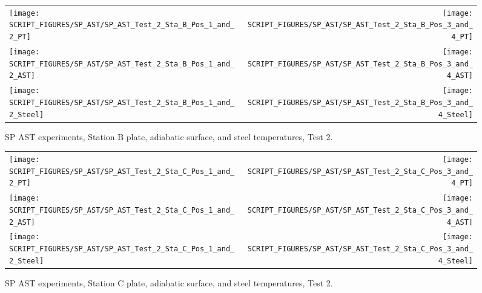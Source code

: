 \begin{figure}[p]
\begin{tabular*}{\textwidth}{l@{\extracolsep{\fill}}r}
\texttt{[image: SCRIPT\_FIGURES/SP\_AST/SP\_AST\_Test\_2\_Sta\_B\_Pos\_1\_and\_2\_PT]} &
\texttt{[image: SCRIPT\_FIGURES/SP\_AST/SP\_AST\_Test\_2\_Sta\_B\_Pos\_3\_and\_4\_PT]} \\
\texttt{[image: SCRIPT\_FIGURES/SP\_AST/SP\_AST\_Test\_2\_Sta\_B\_Pos\_1\_and\_2\_AST]} &
\texttt{[image: SCRIPT\_FIGURES/SP\_AST/SP\_AST\_Test\_2\_Sta\_B\_Pos\_3\_and\_4\_AST]} \\
\texttt{[image: SCRIPT\_FIGURES/SP\_AST/SP\_AST\_Test\_2\_Sta\_B\_Pos\_1\_and\_2\_Steel]} &
\texttt{[image: SCRIPT\_FIGURES/SP\_AST/SP\_AST\_Test\_2\_Sta\_B\_Pos\_3\_and\_4\_Steel]}
\end{tabular*}
\caption[SP AST experiments, Station B plate, adiabatic surface, and steel temperatures, Test 2]{SP AST experiments, Station B plate, adiabatic surface, and steel temperatures, Test 2.}
\label{SP_Test_2_Station_B}
\end{figure}

\begin{figure}[p]
\begin{tabular*}{\textwidth}{l@{\extracolsep{\fill}}r}
\texttt{[image: SCRIPT\_FIGURES/SP\_AST/SP\_AST\_Test\_2\_Sta\_C\_Pos\_1\_and\_2\_PT]} &
\texttt{[image: SCRIPT\_FIGURES/SP\_AST/SP\_AST\_Test\_2\_Sta\_C\_Pos\_3\_and\_4\_PT]} \\
\texttt{[image: SCRIPT\_FIGURES/SP\_AST/SP\_AST\_Test\_2\_Sta\_C\_Pos\_1\_and\_2\_AST]} &
\texttt{[image: SCRIPT\_FIGURES/SP\_AST/SP\_AST\_Test\_2\_Sta\_C\_Pos\_3\_and\_4\_AST]} \\
\texttt{[image: SCRIPT\_FIGURES/SP\_AST/SP\_AST\_Test\_2\_Sta\_C\_Pos\_1\_and\_2\_Steel]} &
\texttt{[image: SCRIPT\_FIGURES/SP\_AST/SP\_AST\_Test\_2\_Sta\_C\_Pos\_3\_and\_4\_Steel]}
\end{tabular*}
\caption[SP AST experiments, Station C plate, adiabatic surface, and steel temperatures, Test 2]{SP AST experiments, Station C plate, adiabatic surface, and steel temperatures, Test 2.}
\label{SP_Test_2_Station_C}
\end{figure}


